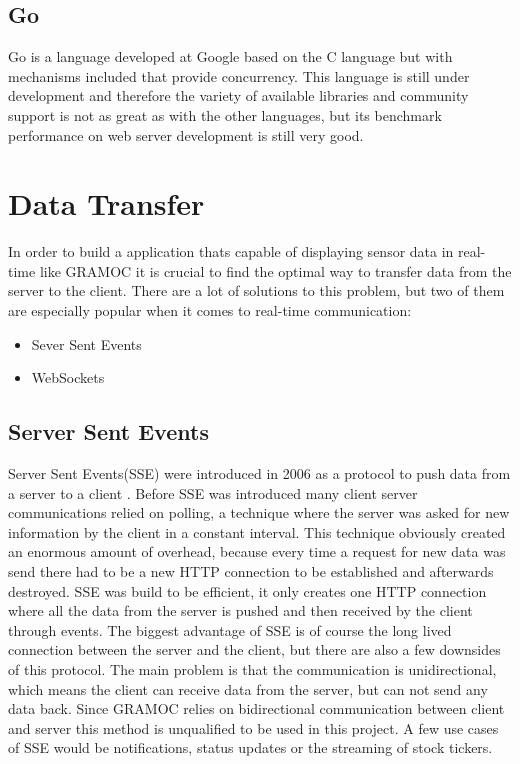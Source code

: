 \subsection{Go}
Go is a language developed at Google based on the C language but with mechanisms included that provide concurrency. This language is still under development and therefore the variety of available libraries and community support is not as great as with the other languages, but its benchmark performance on web server development is still very good.

\section{Data Transfer}
In order to build a application thats capable of displaying sensor data in real-time like GRAMOC it is crucial to find the optimal way to transfer data from the server to the client. There are a lot of solutions to this problem, but two of them are especially popular when it comes to real-time communication:

\begin{itemize}
    \item Sever Sent Events
    \item WebSockets
\end{itemize}

\subsection{Server Sent Events}
\label{subsec:sse}
Server Sent Events(SSE) were introduced in 2006 as a protocol to push data from a server to a client \autocite{sse}. Before SSE was introduced many client server communications relied on polling, a technique where the server was asked for new information by the client in a constant interval. This technique obviously created an enormous amount of overhead, because every time a request for new data was send there had to be a new HTTP connection to be established and afterwards destroyed. SSE was build to be efficient, it only creates one HTTP connection where all the data from the server is pushed and then received by the client through events. The biggest advantage of SSE is of course the long lived connection between the server and the client, but there are also a few downsides of this protocol. The main problem is that the communication is unidirectional, which means the client can receive data from the server, but can not send any data back. Since GRAMOC relies on bidirectional communication between client and server this method is unqualified to be used in this project. A few use cases of SSE would be notifications, status updates or the streaming of stock tickers.


